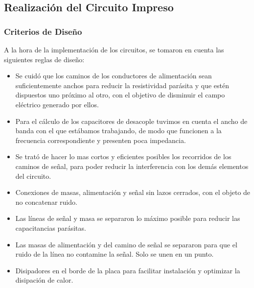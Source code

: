 \subsection{Realización del Circuito Impreso}
\bigskip 
\subsubsection{Criterios de Diseño}

A la hora de la implementación de los circuitos, se tomaron en cuenta las siguientes reglas de diseño:
\begin{itemize}
\bigskip 

\item Se cuidó que los caminos de los conductores de alimentación sean suficientemente anchos para reducir la resistividad parásita y que estén dispuestos uno próximo al otro, con el objetivo de disminuir el campo eléctrico generado por ellos.

\item Para el cálculo de los capacitores de desacople tuvimos en cuenta el ancho de banda con el que estábamos trabajando, de modo que funcionen a la frecuencia correspondiente y presenten poca impedancia.

\item Se trató de hacer lo mas cortos y eficientes posibles los recorridos de los caminos de señal, para poder reducir la interferencia con los demás elementos del circuito.

\item Conexiones de masas, alimentación y señal sin lazos cerrados, con el objeto de no concatenar ruido.

\item Las líneas de señal y masa se separaron lo máximo posible para reducir las capacitancias parásitas.

\item Las masas de alimentación y del camino de señal se separaron para que el ruido de la línea no contamine la señal. Solo se unen en un punto.

\item Disipadores en el borde de la placa para facilitar instalación y optimizar la disipación de calor.

\end{itemize}



